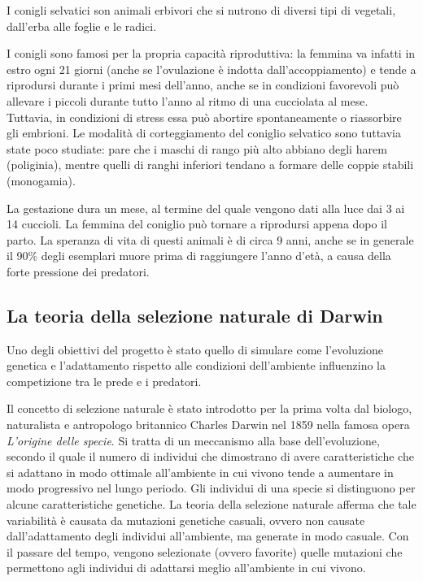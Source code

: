 \documentclass[11pt]{article}
\begin{document}
I conigli selvatici son animali erbivori che si nutrono di diversi tipi di vegetali, dall'erba alle foglie e le radici. 

I conigli sono famosi per la propria capacità riproduttiva: la femmina va infatti in estro ogni 21 giorni (anche se l'ovulazione è indotta dall'accoppiamento) e tende a riprodursi durante i primi mesi dell'anno, anche se in condizioni favorevoli può allevare i piccoli durante tutto l'anno al ritmo di una cucciolata al mese. Tuttavia, in condizioni di stress essa può abortire spontaneamente o riassorbire gli embrioni.
Le modalità di corteggiamento del coniglio selvatico sono tuttavia state poco studiate: pare che i maschi di rango più alto abbiano degli harem (poliginia), mentre quelli di ranghi inferiori tendano a formare delle coppie stabili (monogamia).

La gestazione dura un mese, al termine del quale vengono dati alla luce dai 3 ai 14 cuccioli. La femmina del coniglio può tornare a riprodursi appena dopo il parto\cite{Gattoni2019Apr}.  La speranza di vita di questi animali è di circa 9 anni, anche se in generale il 90\% degli esemplari muore prima di raggiungere l'anno d'età, a causa della forte pressione dei predatori. 


\subsection{La teoria della selezione naturale di Darwin}
Uno degli obiettivi del progetto è stato quello di simulare come l'evoluzione genetica e l'adattamento rispetto alle condizioni dell'ambiente influenzino la competizione tra le prede e i predatori. 

Il concetto di selezione naturale è stato introdotto per la prima volta dal biologo, naturalista e antropologo britannico Charles Darwin nel 1859 nella famosa opera \emph{L'origine delle specie}\cite{darwin1859}. Si tratta di un meccanismo alla base dell'evoluzione, secondo il quale il numero di individui che dimostrano di avere caratteristiche che si adattano in modo ottimale all'ambiente in cui vivono tende a aumentare in modo progressivo nel lungo periodo.
Gli individui di una specie si distinguono per alcune caratteristiche genetiche. La teoria della selezione naturale afferma che tale variabilità è causata da mutazioni genetiche casuali, ovvero non causate dall'adattamento degli individui all'ambiente, ma generate in modo casuale. Con il passare del tempo, vengono selezionate (ovvero favorite) quelle mutazioni che permettono agli individui di adattarsi meglio all'ambiente in cui vivono. 
\end{document}
